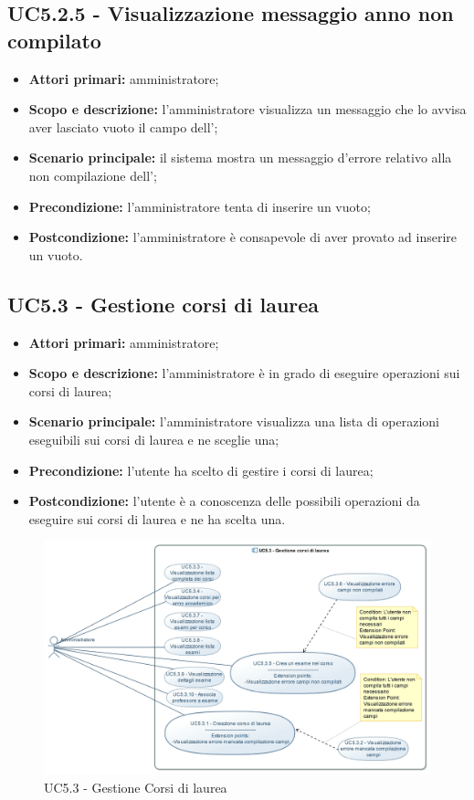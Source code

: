 \documentclass[AnalisiDeiRequisiti.tex]{subfiles}
\begin{document}
\subsection{UC5.2.5 - Visualizzazione messaggio anno non compilato}
\begin{itemize}
	\item \textbf{Attori primari:} amministratore;
	\item \textbf{Scopo e descrizione:} l'amministratore visualizza un messaggio che lo avvisa aver lasciato vuoto il campo dell';
	\item \textbf{Scenario principale:} il sistema mostra un messaggio d'errore relativo alla non compilazione dell';
	\item \textbf{Precondizione:} l'amministratore tenta di inserire un  vuoto; 
	\item \textbf{Postcondizione:} l'amministratore è consapevole di aver provato ad inserire un  vuoto.
\end{itemize}
\subsection{UC5.3 - Gestione corsi di laurea}
\begin{itemize}
	\item \textbf{Attori primari:} amministratore;
	\item \textbf{Scopo e descrizione:} l'amministratore è in grado di eseguire operazioni sui corsi di laurea;
	\item \textbf{Scenario principale:} l'amministratore visualizza una lista di operazioni eseguibili sui corsi di laurea e ne sceglie una;
	\item \textbf{Precondizione:} l'utente ha scelto di gestire i corsi di laurea; 
	\item \textbf{Postcondizione:} l'utente è a conoscenza delle possibili operazioni da eseguire sui corsi di laurea e ne ha scelta una.
\end{itemize}

\begin{figure}[H]
	\centering
	\includegraphics[width=1.0\linewidth]{UC5_3.jpg}
	\caption{UC5.3 - Gestione Corsi di laurea}
	\label{fig:UC5.3 - Gestione Corsi di laurea}
\end{figure}
\end{document}
